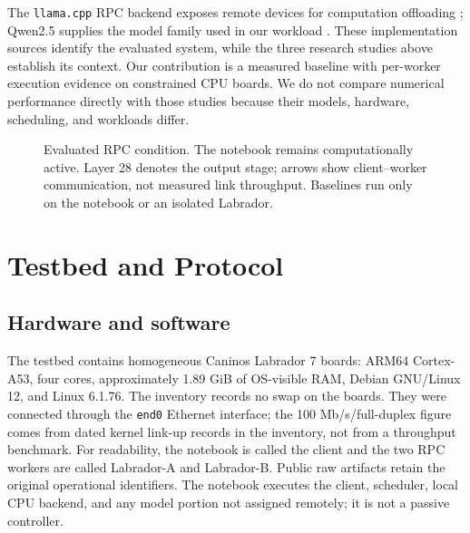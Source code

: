\documentclass[letterpaper,conference]{IEEEtran}
\begin{document}
The \texttt{llama.cpp} RPC backend exposes remote devices for computation offloading \cite{ggmlrpc2026}; Qwen2.5 supplies the model family used in our workload \cite{qwen25}. These implementation sources identify the evaluated system, while the three research studies above establish its context. Our contribution is a measured baseline with per-worker execution evidence on constrained CPU boards. We do not compare numerical performance directly with those studies because their models, hardware, scheduling, and workloads differ.

\begin{figure}[t]\centering
{}
\caption{Evaluated RPC condition. The notebook remains computationally active. Layer 28 denotes the output stage; arrows show client--worker communication, not measured link throughput. Baselines run only on the notebook or an isolated Labrador.}\label{fig:architecture}\end{figure}

\section{Testbed and Protocol}

\subsection{Hardware and software}

The testbed contains homogeneous Caninos Labrador 7 boards: ARM64 Cortex-A53, four cores, approximately 1.89 GiB of OS-visible RAM, Debian GNU/Linux 12, and Linux 6.1.76. The inventory records no swap on the boards. They were connected through the \texttt{end0} Ethernet interface; the 100 Mb/s/full-duplex figure comes from dated kernel link-up records in the inventory, not from a throughput benchmark. For readability, the notebook is called the client and the two RPC workers are called Labrador-A and Labrador-B. Public raw artifacts retain the original operational identifiers. The notebook executes the client, scheduler, local CPU backend, and any model portion not assigned remotely; it is not a passive controller.
\end{document}
